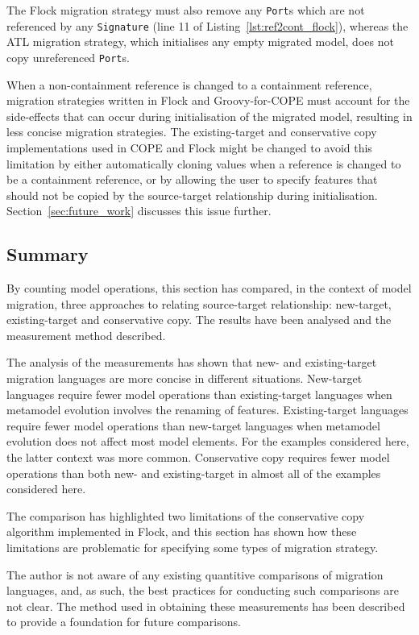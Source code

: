 The Flock migration strategy must also remove any \texttt{Port}s which are not referenced by any \texttt{Signature} (line 11 of Listing~\ref{lst:ref2cont_flock}), whereas the ATL migration strategy, which initialises any empty migrated model, does not copy unreferenced \texttt{Port}s.

When a non-containment reference is changed to a containment reference, migration strategies written in Flock and Groovy-for-COPE must account for the side-effects that can occur during initialisation of the migrated model, resulting in less concise migration strategies. The existing-target and conservative copy implementations used in COPE and Flock might be changed to avoid this limitation by either automatically cloning values when a reference is changed to be a containment reference, or by allowing the user to specify features that should not be copied by the source-target relationship during initialisation. Section~\ref{sec:future_work} discusses this issue further. 

\subsection{Summary}
By counting model operations, this section has compared, in the context of model migration, three approaches to relating source-target relationship: new-target, existing-target and conservative copy. The results have been analysed and the measurement method described.

The analysis of the measurements has shown that new- and existing-target migration languages are more concise in different situations. New-target languages require fewer model operations than existing-target languages when metamodel evolution involves the renaming of features. Existing-target languages require fewer model operations than new-target languages when metamodel evolution does not affect most model elements. For the examples considered here, the latter context was more common. Conservative copy requires fewer model operations than both new- and existing-target in almost all of the examples considered here.

The comparison has highlighted two limitations of the conservative copy algorithm implemented in Flock, and this section has shown how these limitations are problematic for specifying some types of migration strategy.

The author is not aware of any existing quantitive comparisons of migration languages, and, as such, the best practices for conducting such comparisons are not clear. The method used in obtaining these measurements has been described to provide a foundation for future comparisons. 

